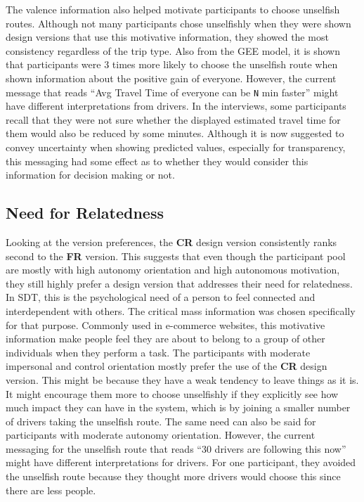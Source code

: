 The valence information also helped motivate participants to choose unselfish routes. Although not many participants chose unselfishly when they were shown design versions that use this motivative information, they showed the most consistency regardless of the trip type. Also from the GEE model, it is shown that participants were 3 times more likely to choose the unselfish route when shown information about the positive gain of everyone. However, the current message that reads ``Avg Travel Time of everyone can be \verb|N| min faster'' might have different interpretations from drivers. In the interviews, some participants recall that they were not sure whether the displayed estimated travel time for them would also be reduced by some minutes. Although it is now suggested to convey uncertainty when showing predicted values, especially for transparency, this messaging had some effect as to whether they would consider this information for decision making or not.

\subsection{Need for Relatedness}
Looking at the version preferences, the \textbf{CR} design version consistently ranks second to the \textbf{FR} version. This suggests that even though the participant pool are mostly with high autonomy orientation and high autonomous motivation, they still highly prefer a design version that addresses their need for relatedness. In SDT, this is the psychological need of a person to feel connected and interdependent with others. The critical mass information was chosen specifically for that purpose. Commonly used in e-commerce websites, this motivative information make people feel they are about to belong to a group of other individuals when they perform a task. The participants with moderate impersonal and control orientation mostly prefer the use of the \textbf{CR} design version. This might be because they have a weak tendency to leave things as it is. It might encourage them more to choose unselfishly if they explicitly see how much impact they can have in the system, which is by joining a smaller number of drivers taking the unselfish route. The same need can also be said for participants with moderate autonomy orientation. However, the current messaging for the unselfish route that reads ``30 drivers are following this now'' might have different interpretations for drivers. For one participant, they avoided the unselfish route because they thought more drivers would choose this since there are less people. 

